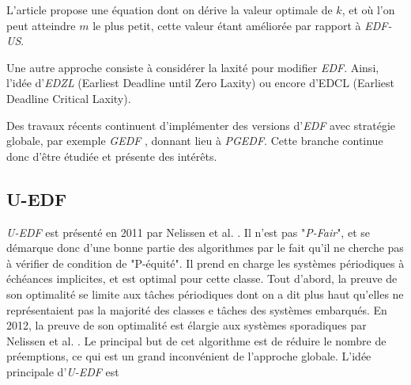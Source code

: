 \documentclass[11pt,a4paper,oneside]{report}
\begin{document}
	L'article propose une équation dont on dérive la valeur optimale de $k$, et où l'on peut 
	atteindre $m$ le plus petit, cette valeur étant améliorée par rapport à \textit{EDF-US}.\medskip
	
	Une autre approche consiste à considérer la laxité pour modifier \textit{EDF}. 
	Ainsi, l'idée d'\textit{EDZL} (Earliest Deadline until Zero Laxity) \cite{cirinei_edzl_2007} ou encore d'EDCL \cite{kato_real-time_2007}
	(Earliest Deadline Critical Laxity). \medskip
	
	Des travaux récents continuent d'implémenter des versions d'\textit{EDF} avec stratégie 
	globale, par exemple \textit{GEDF} \cite{li_global_2015}, donnant lieu à \textit{PGEDF}. Cette 
	branche continue donc d'être étudiée et présente des intérêts.
	
	\subsection{U-EDF}
	\textit{U-EDF} est présenté en 2011 par Nelissen et al. \cite{nelissen_reducing_2011}. Il n'est pas "\textit{P-Fair}", et se démarque donc d'une bonne partie des algorithmes 
	par le fait qu'il ne cherche pas à vérifier de condition de "P-équité".
	Il prend en charge les systèmes périodiques à échéances implicites, et est optimal pour cette classe. 
	Tout d'abord, la preuve de son optimalité se limite aux tâches périodiques dont on a dit plus haut qu'elles 
	ne représentaient pas la majorité des classes e tâches des systèmes embarqués. 
	En 2012, la preuve de son optimalité est élargie aux systèmes sporadiques par  Nelissen et al. \cite{nelissen_u-edf_2012}. Le principal but de cet algorithme est de réduire le nombre de préemptions, 
	ce qui est un grand inconvénient de l'approche globale. \medskip
	L'idée principale d'\textit{U-EDF} est %
	
\end{document}
